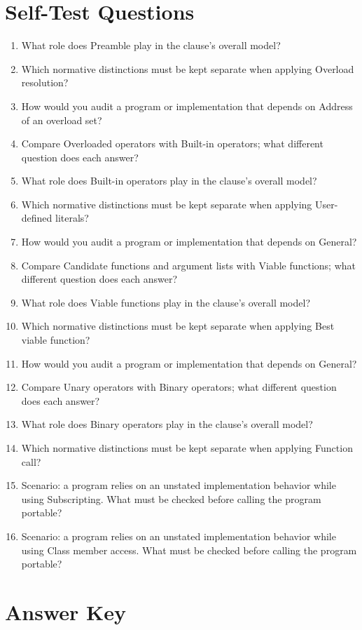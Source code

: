\documentclass[11pt,letterpaper]{article}
\begin{document}
\section{Self-Test Questions}
\begin{enumerate}
\item What role does Preamble play in the clause's overall model?
\item Which normative distinctions must be kept separate when applying Overload resolution?
\item How would you audit a program or implementation that depends on Address of an overload set?
\item Compare Overloaded operators with Built-in operators; what different question does each answer?
\item What role does Built-in operators play in the clause's overall model?
\item Which normative distinctions must be kept separate when applying User-defined literals?
\item How would you audit a program or implementation that depends on General?
\item Compare Candidate functions and argument lists with Viable functions; what different question does each answer?
\item What role does Viable functions play in the clause's overall model?
\item Which normative distinctions must be kept separate when applying Best viable function?
\item How would you audit a program or implementation that depends on General?
\item Compare Unary operators with Binary operators; what different question does each answer?
\item What role does Binary operators play in the clause's overall model?
\item Which normative distinctions must be kept separate when applying Function call?
\item Scenario: a program relies on an unstated implementation behavior while using Subscripting. What must be checked before calling the program portable?
\item Scenario: a program relies on an unstated implementation behavior while using Class member access. What must be checked before calling the program portable?
\end{enumerate}
\clearpage\section{Answer Key}
\end{document}
